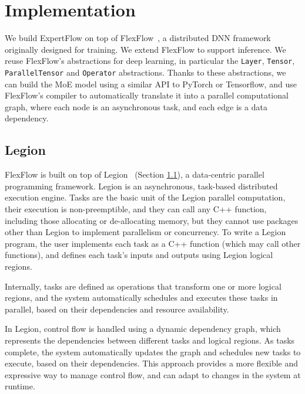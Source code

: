 \section{Implementation}\label{design-implementation}
We build ExpertFlow on top of FlexFlow~\cite{flexflow,unity}, a distributed DNN framework originally designed for training. We extend FlexFlow to support inference. We reuse FlexFlow's abstractions for deep learning, in particular the \texttt{Layer}, \texttt{Tensor}, \texttt{ParallelTensor} and \texttt{Operator} abstractions. Thanks to these abstractions, we can build the MoE model using a similar API to PyTorch or Tensorflow, and use FlexFlow's compiler to automatically translate it into a parallel computational graph, where each node is an asynchronous task, and each edge is a data dependency. 

\subsection{Legion}\label{legion}
FlexFlow is built on top of Legion~\cite{legion} (Section \ref{legion}), a data-centric parallel programming framework. Legion is an asynchronous, task-based distributed execution engine. Tasks are the basic unit of the Legion parallel computation, their execution is non-preemptible, and they can call any C++ function, including those allocating or de-allocating memory, but they cannot use packages other than Legion to implement parallelism or concurrency. To write a Legion program, the user implements each task as a C++ function (which may call other functions), and defines each task's inputs and outputs using Legion logical regions. 

Internally, tasks are defined as operations that transform one or more logical regions, and the system automatically schedules and executes these tasks in parallel, based on their dependencies and resource availability. 

In Legion, control flow is handled using a dynamic dependency graph, which represents the dependencies between different tasks and logical regions. As tasks complete, the system automatically updates the graph and schedules new tasks to execute, based on their dependencies. This approach provides a more flexible and expressive way to manage control flow, and can adapt to changes in the system at runtime.


